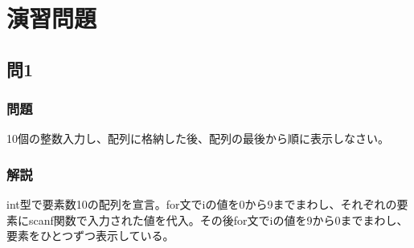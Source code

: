 \section{演習問題}
\subsection{問1}
\subsubsection{問題}
10個の整数入力し、配列に格納した後、配列の最後から順に表示しなさい。

\subsubsection{解説}
int型で要素数10の配列を宣言。for文でiの値を0から9までまわし、それぞれの要素にscanf関数で入力された値を代入。その後for文でiの値を9から0までまわし、要素をひとつずつ表示している。
